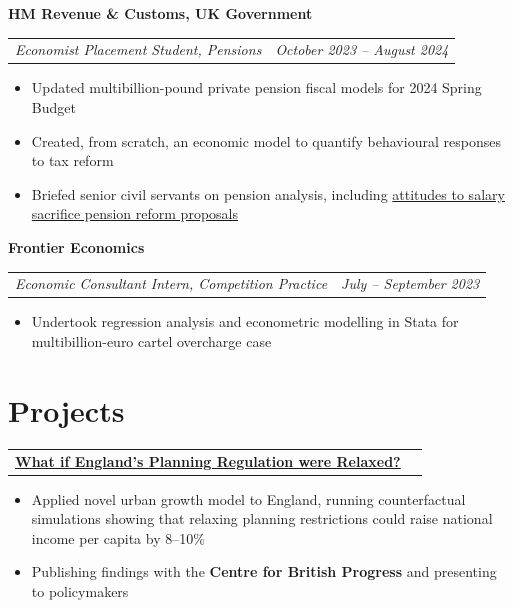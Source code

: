 \documentclass[legalpaper,11pt]{article}
\makeatletter
\newcommand{\resumeSection}[1]{
    \vspace{-9pt}
    \section{#1}
}
\newcommand{\resumeItem}[1]{
  \item\small{#1}
  \vspace{-3pt}
}
\newcommand{\resumeSubheading}[1]{
  \textbf{#1}\\
  \vspace{-1pt}
}
\newcommand{\jobtitleanddate}[2]{
  \begin{tabular*}{0.97\textwidth}{l@{\extracolsep{\fill}}r}
    \textit{\small#1} & \textit{\small#2} \\
  \end{tabular*}\vspace{-4pt}
}
\newcommand{\resumeSubheadingNoJob}[2]{
  \begin{tabular*}{0.97\textwidth}{l@{\extracolsep{\fill}}r}
    \textbf{#1} & \textit{\small#2} \\
  \end{tabular*}
  \vspace{-5pt} %
}
\newcommand{\resumeItemListStart}{\begin{itemize}}
\newcommand{\resumeItemListEnd}{\end{itemize}}
\makeatother
\begin{document}
    \resumeSubheading{HM Revenue \& Customs, UK Government}
    \jobtitleanddate{Economist Placement Student, Pensions}{October 2023 -- August 2024}
      \resumeItemListStart
        \resumeItem{Updated multibillion-pound private pension fiscal models for 2024 Spring Budget}
        \resumeItem{Created, from scratch, an economic model to quantify behavioural responses to tax reform}
        \resumeItem{Briefed senior civil servants on pension analysis, including \href{https://www.gov.uk/government/publications/understanding-the-attitudes-and-behaviours-of-employers-towards-salary-sacrifice-for-pensions}{attitudes to salary sacrifice pension reform proposals}}
      \resumeItemListEnd

    
    \resumeSubheading{Frontier Economics}
    \jobtitleanddate{Economic Consultant Intern, Competition Practice}{July -- September 2023}
      \resumeItemListStart
        \resumeItem{Undertook regression analysis and econometric modelling in Stata for multibillion-euro cartel overcharge case}
      \resumeItemListEnd

\resumeSection{Projects}
    \resumeSubheadingNoJob{\href{https://urban-growth-england.vercel.app/}{What if England's Planning Regulation were Relaxed?}}{}
    \resumeItemListStart
        \resumeItem{Applied novel urban growth model to England, 
        running counterfactual simulations showing that relaxing planning restrictions could raise national income per capita by 8--10\%}
        \resumeItem{Publishing findings with the \textbf{Centre for British Progress} and presenting to policymakers}
    \resumeItemListEnd
\end{document}

